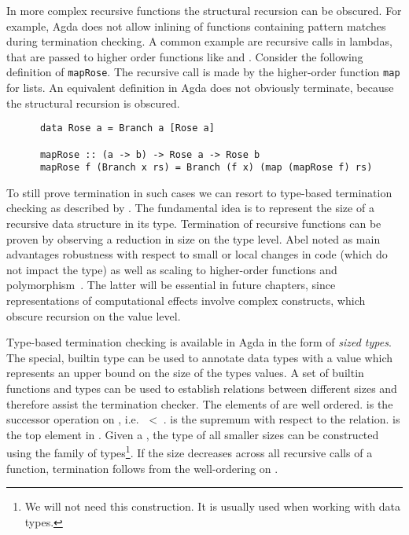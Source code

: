 In more complex recursive functions the structural recursion can be obscured.
For example, Agda does not allow inlining of functions containing pattern
matches during termination checking.
A common example are recursive calls in lambdas, that are passed to higher
order functions like  and \AgdaFunction{>>=}.
Consider the following definition of \texttt{mapRose}.
The recursive call is made by the higher-order function
\texttt{map} for lists.
An equivalent definition in Agda does not obviously terminate, because the
structural recursion is obscured.

\begin{verbatim}
      data Rose a = Branch a [Rose a]

      mapRose :: (a -> b) -> Rose a -> Rose b
      mapRose f (Branch x rs) = Branch (f x) (map (mapRose f) rs)
\end{verbatim}
To still prove termination in such cases we can resort to type-based
termination checking as described by \textcite{DBLP:journals/lmcs/Abel08}.
The fundamental idea is to represent the size of a recursive data structure in
its type.
Termination of recursive functions can be proven by observing a reduction in
size on the type level.
Abel noted as main advantages robustness with respect to small or local changes
in code (which do not impact the type) as well as scaling to higher-order
functions and polymorphism~\cite{DBLP:journals/lmcs/Abel08}.
The latter will be essential in future chapters, since representations of
computational effects involve complex constructs, which obscure recursion on the
value level.

Type-based termination checking is available in Agda in the form of
\textit{sized types}.
The special, builtin type  can be used to annotate data types
with a value which represents an upper bound on the size of the types values.
A set of builtin functions and types can be used to establish relations between
different sizes and therefore assist the termination checker.
The elements of  are well ordered.
 is the successor operation on , i.e. 
$\;<\;$\AgdaSpace{}.
 is the supremum with respect to the relation.
 is the top element in .
Given a  , the type of all smaller sizes can
be constructed using the  family of types\footnote{We will
  not need this construction. It is usually used when working with
   data types.}.
If the size decreases across all recursive calls of a function, termination
follows from the well-ordering on .

